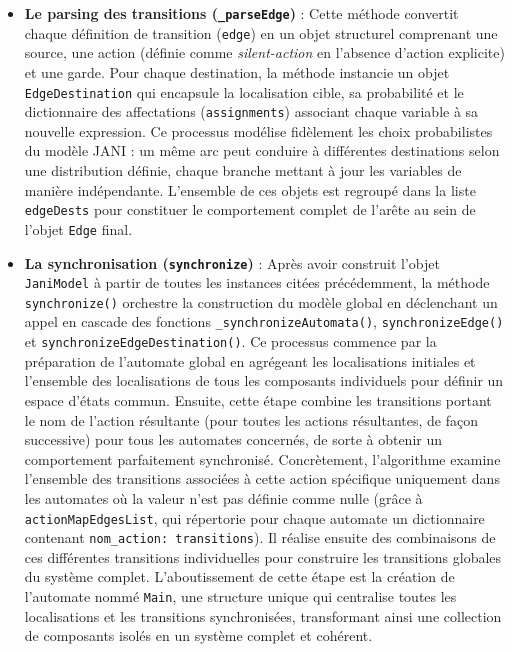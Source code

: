 \documentclass[14pt, a4paper]{extarticle}
\begin{document}
\begin{itemize}
    \item \textbf{Le parsing des transitions (\texttt{\_parseEdge})} : Cette méthode convertit chaque définition de transition (\texttt{edge}) en un objet structurel comprenant une source, une action (définie comme \textit{silent-action} en l'absence d'action explicite) et une garde. Pour chaque destination, la méthode instancie un objet \texttt{EdgeDestination} qui encapsule la localisation cible, sa probabilité et le dictionnaire des affectations (\texttt{assignments}) associant chaque variable à sa nouvelle expression. Ce processus modélise fidèlement les choix probabilistes du modèle JANI : un même arc peut conduire à différentes destinations selon une distribution définie, chaque branche mettant à jour les variables de manière indépendante. L'ensemble de ces objets est regroupé dans la liste \texttt{edgeDests} pour constituer le comportement complet de l'arête au sein de l'objet \texttt{Edge} final.
\item \textbf{La synchronisation (\texttt{synchronize})} : Après avoir construit l'objet \texttt{JaniModel} à partir de toutes les instances citées précédemment, la méthode \texttt{synchronize()} orchestre la construction du modèle global en déclenchant un appel en cascade des fonctions \texttt{\_synchronizeAutomata()}, \texttt{synchronizeEdge()} et \texttt{synchronizeEdgeDestination()}. Ce processus commence par la préparation de l'automate global en agrégeant les localisations initiales et l'ensemble des localisations de tous les composants individuels pour définir un espace d'états commun. Ensuite, cette étape combine les transitions portant le nom de l'action résultante (pour toutes les actions résultantes, de façon successive) pour tous les automates concernés, de sorte à obtenir un comportement parfaitement synchronisé. Concrètement, l'algorithme examine l'ensemble des transitions associées à cette action spécifique uniquement dans les automates où la valeur n'est pas définie comme nulle (grâce à \texttt{actionMapEdgesList}, qui répertorie pour chaque automate un dictionnaire contenant \texttt{nom\_action: transitions}). Il réalise ensuite des combinaisons de ces différentes transitions individuelles pour construire les transitions globales du système complet. L'aboutissement de cette étape est la création de l'automate nommé \texttt{Main}, une structure unique qui centralise toutes les localisations et les transitions synchronisées, transformant ainsi une collection de composants isolés en un système complet et cohérent.
\end{itemize}
\end{document}
